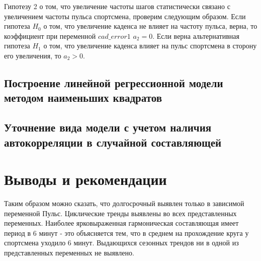 \documentclass[a4paper,12pt]{article}
\begin{document}
Гипотезу 2 о том, что увеличение частоты шагов статистически связано с увеличением частоты пульса спортсмена, проверим следующим образом. Если гипотеза $H_0$ о том, что увеличение каденса не влияет на частоту пульса, верна, то коэффициент при переменной $cad\_error1$ $a_2 = 0$. Если верна альтернативная гипотеза $H_1$ о том, что увеличение каденса влияет на пульс спортсмена в сторону его увеличения, то $a_2 > 0$.

\subsection{Построение линейной регрессионной модели методом наименьших квадратов}


\subsection{Уточнение вида модели с учетом наличия автокорреляции в случайной составляющей}


\section{Выводы и рекомендации}
Таким образом можно сказать, что долгосрочный выявлен только в зависимой переменной Пульс. Циклические тренды выявлены во всех представленных переменных. Наиболее ярковыраженная гармоническая составляющая имеет период в 6 минут - это объясняется тем, что в среднем на прохождение круга у спортсмена уходило 6 минут. Выдающихся сезонных трендов ни в одной из представленных переменных не выявлено.  
\end{document}
